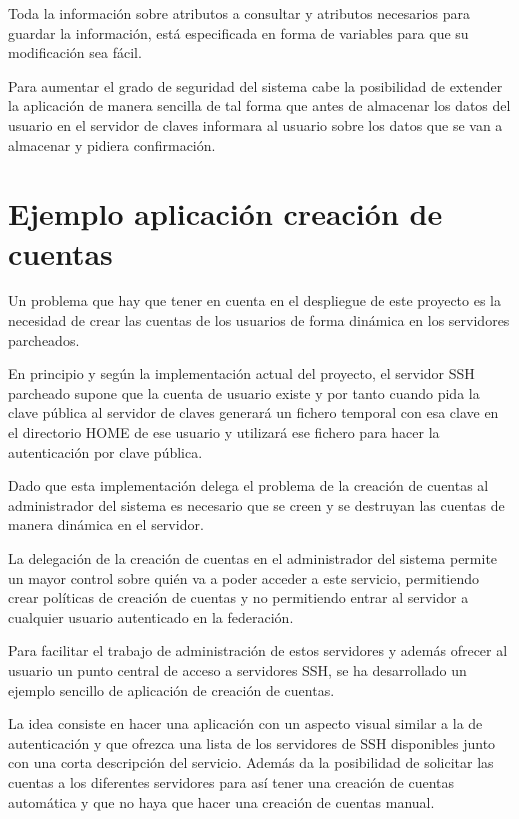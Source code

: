     Toda la información sobre atributos a consultar y atributos necesarios
    para guardar la información, está especificada en forma de variables
    para que su modificación sea fácil.

    Para aumentar el grado de seguridad del sistema cabe la posibilidad de
    extender la aplicación de manera sencilla de tal forma que antes de
    almacenar los datos del usuario en el servidor de claves informara al
    usuario sobre los datos que se van a almacenar y pidiera confirmación.

    \section{Ejemplo aplicación creación de cuentas}

    Un problema que hay que tener en cuenta en el despliegue de este
    proyecto es la necesidad de crear las cuentas de los usuarios de forma
    dinámica en los servidores parcheados.

    En principio y según la implementación actual del proyecto, el
    servidor SSH parcheado supone que la cuenta de usuario existe y por
    tanto cuando pida la clave pública al servidor de claves generará un
    fichero temporal con esa clave en el directorio HOME de ese usuario y
    utilizará ese fichero para hacer la autenticación por clave pública.

    Dado que esta implementación delega el problema de la creación de
    cuentas al administrador del sistema es necesario que se creen y se
    destruyan las cuentas de manera dinámica en el servidor.

    La delegación de la creación de cuentas en el administrador del
    sistema permite un mayor control sobre quién va a poder acceder a este
    servicio, permitiendo crear políticas de creación de cuentas y no
    permitiendo entrar al servidor a cualquier usuario autenticado en la
    federación.

    Para facilitar el trabajo de administración de estos servidores y
    además ofrecer al usuario un punto central de acceso a servidores SSH,
    se ha desarrollado un ejemplo sencillo de aplicación de creación de
    cuentas.

    La idea consiste en hacer una aplicación con un aspecto visual similar
    a la de autenticación y que ofrezca una lista de los servidores de SSH
    disponibles junto con una corta descripción del servicio. Además da la
    posibilidad de solicitar las cuentas a los diferentes servidores para
    así tener una creación de cuentas automática y que no haya que hacer
    una creación de cuentas manual.

